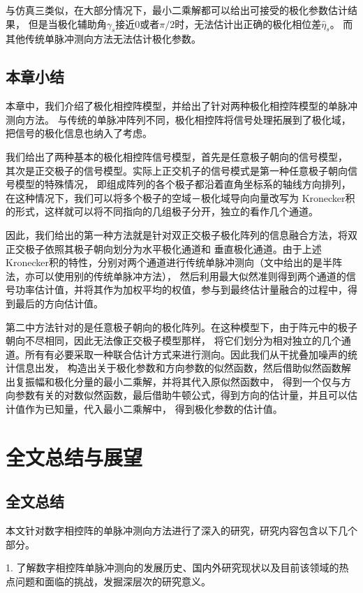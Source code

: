 \documentclass[master]{thesis-uestc}
\begin{document}
与仿真三类似，在大部分情况下，最小二乘解都可以给出可接受的极化参数估计结果，
但是当极化辅助角$\gamma_s$接近0或者$\pi/2$时，无法估计出正确的极化相位差$\hat{\eta}_s$。
而其他传统单脉冲测向方法无法估计极化参数。

\section{本章小结}
本章中，我们介绍了极化相控阵模型，并给出了针对两种极化相控阵模型的单脉冲测向方法。
与传统的单脉冲阵列不同，极化相控阵将信号处理拓展到了极化域，把信号的极化信息也纳入了考虑。

我们给出了两种基本的极化相控阵信号模型，首先是任意极子朝向的信号模型，
其次是正交极子的信号模型。实际上正交机子的信号模式是第一种任意极子朝向信号模型的特殊情况，
即组成阵列的各个极子都沿着直角坐标系的轴线方向排列，在这种情况下，我们可以将多个极子的空域－极化域导向向量改写为
Kronecker积的形式，这样就可以将不同指向的几组极子分开，独立的看作几个通道。

因此，我们给出的第一种方法就是针对双正交极子极化阵列的信息融合方法，将双正交极子依照其极子朝向划分为水平极化通道和
垂直极化通道。由于上述Kronecker积的特性，分别对两个通道进行传统单脉冲测向（文中给出的是半阵法，亦可以使用别的传统单脉冲方法），
然后利用最大似然准则得到两个通道的信号功率估计值，并将其作为加权平均的权值，参与到最终估计量融合的过程中，得到最后的方向估计值。

第二中方法针对的是任意极子朝向的极化阵列。在这种模型下，由于阵元中的极子朝向不尽相同，因此无法像正交极子模型那样，
将它们划分为相对独立的几个通道。所有有必要采取一种联合估计方式来进行测向。因此我们从干扰叠加噪声的统计信息出发，
构造出关于极化参数和方向参数的似然函数，然后借助似然函数解出复振幅和极化分量的最小二乘解，并将其代入原似然函数中，
得到一个仅与方向参数有关的对数似然函数，最后借助牛顿公式，得到方向的估计量，并且可以估计值作为已知量，代入最小二乘解中，
得到极化参数的估计值。

\chapter{全文总结与展望}
\section{全文总结}
本文针对数字相控阵的单脉冲测向方法进行了深入的研究，研究内容包含以下几个部分。

1. 了解数字相控阵单脉冲测向的发展历史、国内外研究现状以及目前该领域的热点问题和面临的挑战，发掘深层次的研究意义。
\end{document}
